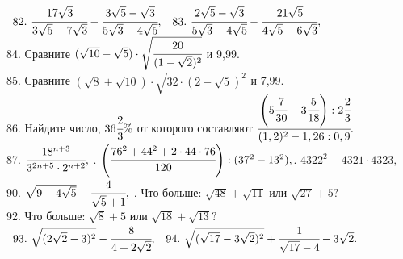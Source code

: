 \documentclass[12pt]{article}
\begin{document}
$\begin{array}{ll}
82.\ \cfrac{17\sqrt{3}}{3\sqrt{5}-7\sqrt{3}}-\cfrac{3\sqrt{5}-\sqrt{3}}{5\sqrt{3}-4\sqrt{5}},&
83.\ \cfrac{2\sqrt{5}-\sqrt{3}}{5\sqrt{3}-4\sqrt{5}}-\cfrac{21\sqrt{5}}{4\sqrt{5}-6\sqrt{3}},
\end{array}$\\
84. Сравните $(\sqrt{10}-\sqrt{5})\cdot\sqrt{\cfrac{20}{(1-\sqrt{2})^2}}$ и 9,99.\\
85. Сравните $(\sqrt{8}+\sqrt{10})\cdot\sqrt{32\cdot(2-\sqrt{5})^2}$ и 7,99.\\
86. Найдите число, $36\cfrac{2}{3}\%$ от которого составляют
$\cfrac{\left(5\cfrac{7}{30}-3\cfrac{5}{18}\right):2\cfrac{2}{3}}{(1,2)^2-1,26:0,9}.$\\
87. $\cfrac{18^{n+3}}{3^{2n+5}\cdot2^{n+2}},$ . $\left(\cfrac{76^2+44^2+2\cdot44\cdot76}{120}\right):(37^2-13^2),$. $4322^2-4321\cdot4323,$ \\ 90. $\sqrt{9-4\sqrt{5}}-\cfrac{4}{\sqrt{5}+1},$ \qquad {}. Что больше: $\sqrt{48}+\sqrt{11}$ или $\sqrt{27}+5?$ \\
92. Что больше: $\sqrt{8}+5$ или $\sqrt{18}+\sqrt{13}?$\\
$\begin{array}{ll}
93.\ \sqrt{(2\sqrt{2}-3)^2}-\cfrac{8}{4+2\sqrt{2}},&
94.\ \sqrt{(\sqrt{17}-3\sqrt{2})^2}+\cfrac{1}{\sqrt{17}-4}-3\sqrt{2}.
\end{array}$
\newpage
\end{document}
